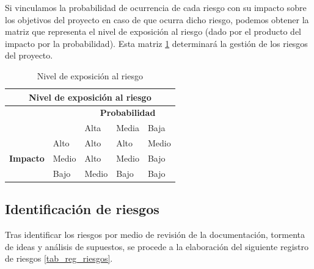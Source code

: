 Si vinculamos la probabilidad de ocurrencia de cada riesgo con su impacto sobre los objetivos del proyecto en caso de que ocurra dicho riesgo, podemos obtener la matriz que representa el nivel de exposición al riesgo (dado por el producto del impacto por la probabilidad). Esta matriz \ref{tab_riesgo} determinará la gestión de los riesgos del proyecto.

\begin{table}[htpb]
\centering
\begin{tabular}{|l|l|l|l|l|}
\hline
\multicolumn{5}{|c|}{\textbf{Nivel de exposición al riesgo}}                         \\ \hline
\multicolumn{2}{|l|}{\multirow{2}{*}{}} & \multicolumn{3}{c|}{\textbf{Probabilidad}} \\ \cline{3-5} 
\multicolumn{2}{|l|}{}                  & Alta      & Media     & Baja      \\ \hline
\multirow{3}{*}{\textbf{Impacto}}     & Alto     & Alto      & Alto      & Medio     \\ \cline{2-5} 
                             & Medio    & Alto      & Medio     & Bajo      \\ \cline{2-5} 
                             & Bajo     & Medio     & Bajo      & Bajo      \\ \hline
\end{tabular}
\caption{Nivel de exposición al riesgo}
\label{tab_riesgo}
\end{table}

\subsection{Identificación de riesgos}
Tras identificar los riesgos por medio  de revisión de la documentación, tormenta de ideas y análisis de supuestos, se procede a la elaboración del siguiente registro de riesgos \ref{tab_reg_riesgos}.

